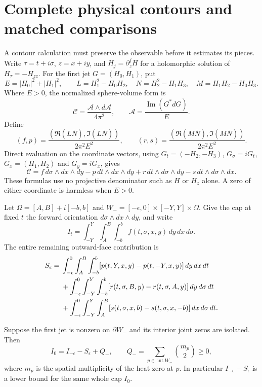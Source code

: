 \section{Complete physical contours and matched comparisons}
\label{sec:complete-contours}

A contour calculation must preserve the observable before it estimates its
pieces.  Write $\tau=t+i\sigma$, $z=x+iy$, and $H_j=\partial_z^jH$ for a
holomorphic solution of $H_\tau=-H_{zz}$.  For the first jet
$G=(H_0,H_1)$, put
\[
 E=|H_0|^2+|H_1|^2,\qquad
 L=H_1^2-H_0H_2,\quad N=H_2^2-H_1H_3,\quad M=H_1H_2-H_0H_3.
\]
Where $E>0$, the normalized sphere-volume form is
\[
 \mathcal C=\frac{\mathcal A\wedge d\mathcal A}{4\pi^2},\qquad
 \mathcal A=\frac{\operatorname{Im}(G^*dG)}{E}.
\]
Define
\[
 (f,p)=\frac{(\Re(L\overline N),\Im(L\overline N))}{2\pi^2E^2},
 \qquad
 (r,s)=\frac{(\Re(M\overline N),\Im(M\overline N))}{2\pi^2E^2}.
\]
Direct evaluation on the coordinate vectors, using
$G_t=(-H_2,-H_3)$, $G_\sigma=iG_t$, $G_x=(H_1,H_2)$ and
$G_y=iG_x$, gives
\begin{equation}
 \mathcal C=f\,d\sigma\wedge dx\wedge dy
 -p\,dt\wedge dx\wedge dy
 +r\,dt\wedge d\sigma\wedge dy
 -s\,dt\wedge d\sigma\wedge dx.
 \label{eq:physical-density}
\end{equation}
These formulas use no projective denominator such as $H$ or $H_z$ alone.
A zero of either coordinate is harmless when $E>0$.

Let $\Omega=[A,B]+i[-b,b]$ and
$W_-=[-\epsilon,0]\times[-Y,Y]\times\Omega$.  Give the cap at fixed $t$
the forward orientation $d\sigma\wedge dx\wedge dy$, and write
\[
 I_t=\int_{-Y}^Y\int_A^B\int_{-b}^b f(t,\sigma,x,y)\,dy\,dx\,d\sigma.
\]
The entire remaining outward-face contribution is
\begin{align}
 S_\epsilon={}&\int_{-\epsilon}^0\int_A^B\int_{-b}^b
 [p(t,Y,x,y)-p(t,-Y,x,y)]\,dy\,dx\,dt\notag\\
 &+\int_{-\epsilon}^0\int_{-Y}^Y\int_{-b}^b
 [r(t,\sigma,B,y)-r(t,\sigma,A,y)]\,dy\,d\sigma\,dt\notag\\
 &+\int_{-\epsilon}^0\int_{-Y}^Y\int_A^B
 [s(t,\sigma,x,b)-s(t,\sigma,x,-b)]\,dx\,d\sigma\,dt.
 \label{eq:all-physical-faces}
\end{align}

\begin{proposition}
Suppose the first jet is nonzero on $\partial W_-$ and its interior joint
zeros are isolated.  Then
\begin{equation}
 I_0=I_{-\epsilon}-S_\epsilon+Q_-,\qquad
 Q_-=\sum_{p\in\operatorname{int}W_-}\binom{m_p}{2}\ge0,
 \label{eq:complete-cap-transfer}
\end{equation}
where $m_p$ is the spatial multiplicity of the heat zero at $p$.
In particular $I_{-\epsilon}-S_\epsilon$ is a lower bound for the same
whole cap $I_0$.
\end{proposition}


